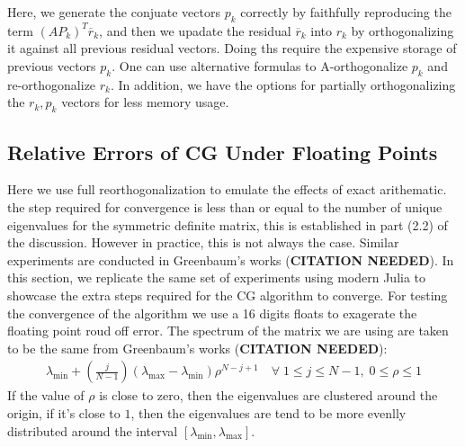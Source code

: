 \documentclass[]{article}
\theoremstyle{definition}
\begin{document}
        Here, we generate the conjuate vectors $p_k$ correctly by faithfully reproducing the term $(AP_k)^T\overline{r}_k$, and then we upadate the residual $\overline{r}_k$ into $r_k$ by orthogonalizing it against all previous residual vectors. Doing ths require the expensive storage of previous vectors $p_k$. One can use alternative formulas to A-orthogonalize $p_k$ and re-orthogonalize $r_k$. In addition, we have the options for partially orthogonalizing the $r_k, p_k$ vectors for less memory usage. 
    \subsection{Relative Errors of CG Under Floating Points}
        Here we use full reorthogonalization to emulate the effects of exact arithematic. the step required for convergence is less than or equal to the number of unique eigenvalues for the symmetric definite matrix, this is established in part (2.2) of the discussion. However in practice, this is not always the case. Similar experiments are conducted in Greenbaum's works (\textbf{CITATION NEEDED}). In this section, we replicate the same set of experiments using modern Julia to showcase the extra steps required for the CG algorithm to converge. For testing the convergence of the algorithm we use a 16 digits floats to exagerate the floating point roud off error. The spectrum of the matrix we are using are taken to be the same from Greenbaum's works (\textbf{CITATION NEEDED}): 
        \begin{align}
            \lambda_{\min} + \left(
                \frac{j}{N - 1}
            \right)(\lambda_{\max} - \lambda_{\min})\rho^{N - j + 1}\quad \forall\; 1 \le j \le N - 1, \; 0 \le \rho \le 1
        \end{align}
        If the value of $\rho$ is close to zero, then the eigenvalues are clustered around the origin, if it's close to $1$, then the eigenvalues are tend to be more evenlly distributed around the interval $[\lambda_{\min}, \lambda_{\max}]$. 
\end{document}
